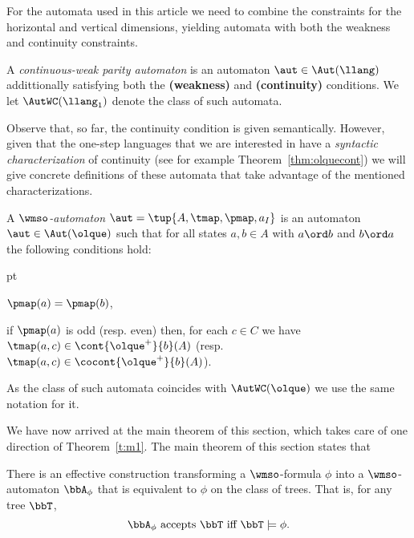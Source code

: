 For the automata used in this article we need to combine the constraints for the horizontal and vertical dimensions, yielding automata with both the weakness and continuity constraints.

\begin{definition}
A \emph{continuous-weak parity automaton} is an automaton $\aut \in \Aut(\llang)$ addittionally satisfying both the \textbf{(weakness)} and \textbf{(continuity)} conditions.
We let $\AutWC(\llang_1)$ denote the class of such automata.%
\end{definition}

Observe that, so far, the continuity condition is given semantically.
However, given that the one-step languages that we are interested in have
a \emph{syntactic characterization} of continuity (see for example Theorem~\ref{thm:olquecont})
we will give concrete definitions of these automata that take advantage of the mentioned characterizations.

\begin{definition}
A \emph{$\wmso$-automaton} $\aut = \tup{A,\tmap,\pmap,a_I}$ is an automaton $\aut \in \Aut(\olque)$ such that for all states $a,b \in A$ with $a \ord b$ and $b\ord a$ the following conditions hold:
\begin{description}
	 pt
	\item[(weakness)] $\pmap(a)=\pmap(b)$,
	\item[(continuity)] if $\pmap(a)$ is odd (resp. even) then, for each $c\in C$ we have
	   $\tmap(a,c) \in \cont{{\olque}^+}{b}(A)$ (resp. $\tmap(a,c) \in \cocont{{\olque}^+}{b}(A)$).
\end{description}
As the class of such automata coincides with $\AutWC(\olque)$ we use the same notation for it.
\end{definition}


We have now arrived at the main theorem of this section, which takes care of
one direction of Theorem~\ref{t:m1}. The main theorem of this section states that

\begin{theorem}
\label{t:wmsoauto}
There is an effective construction transforming a $\wmso$-formula $\phi$
into a $\wmso$-automaton $\bbA_{\phi}$ that is equivalent
to $\phi$ on the class of trees.
That is, for any tree $\bbT$,
\begin{equation}
\bbA_{\phi} \text{ accepts } \bbT \text{ iff } \bbT \models {\phi}.
\end{equation}
\end{theorem}

